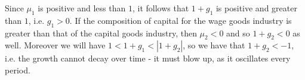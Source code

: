 Since $\mu_1$ is positive and less than $1$, it follows that $1+g_1$ is positive and greater than $1$, i.e. $g_1 > 0$. If the composition of capital for the wage goods industry is greater than that of the capital goods industry, then $\mu_2 < 0$ and so $1+g_2 < 0$ as well. Moreover we will have $1 < 1+g_1 < |1+g_2|$, so we have that $1+g_2 < -1$, i.e. the growth cannot decay over time - it must blow up, as it oscillates every period. 
\begin{corollary}
	
\end{corollary}

